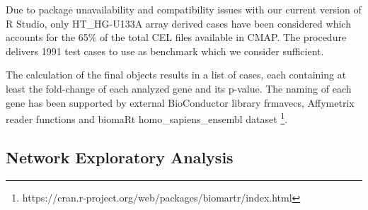 Due to package unavailability and compatibility issues with our current version of R Studio, only HT\_HG-U133A array derived cases have been considered which accounts for the 65\% of the total CEL files available in CMAP. The procedure delivers 1991 test cases to use as benchmark which we consider sufficient.

The calculation of the final objects results in a list of cases, each containing at least the fold-change of each analyzed gene and its p-value. The naming of each gene has been supported by external BioConductor library frmavecs, Affymetrix reader functions and biomaRt homo\_sapiens\_ensembl dataset \footnote{https://cran.r-project.org/web/packages/biomartr/index.html}.
\label{section:suppl:bench}

\subsection{Network Exploratory Analysis}
\label{section:suppl:eda}

